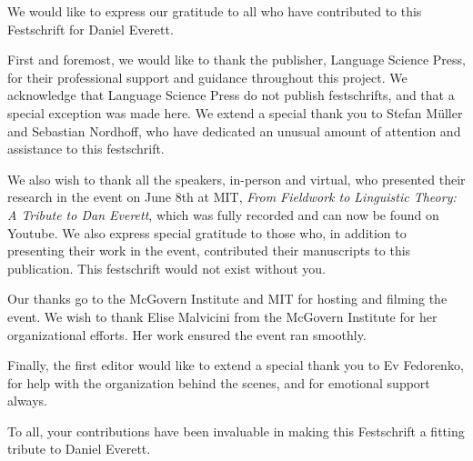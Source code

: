 \addchap{\lsAcknowledgementTitle} 

We would like to express our gratitude to all who have contributed to this Festschrift for Daniel Everett. 

First and foremost, we would like to thank the publisher, Language Science Press, for their professional support and guidance throughout this project. We acknowledge that Language Science Press do not publish festschrifts, and that a special exception was made here. We extend a special thank you to Stefan Müller and Sebastian Nordhoff, who have dedicated an unusual amount of attention and assistance to this festschrift. 

We also wish to thank all the speakers, in-person and virtual, who presented their research in the event on June 8th at MIT, \textit{From Fieldwork to Linguistic Theory: A Tribute to Dan Everett}, which was fully recorded and can now be found on Youtube. We also express special gratitude to those who, in addition to presenting their work in the event, contributed their manuscripts to this publication. This festschrift would not exist without you. 

Our thanks go to the McGovern Institute and MIT for hosting and filming the event. We wish to thank Elise Malvicini from the McGovern Institute for her organizational efforts. Her work ensured the event ran smoothly. 

Finally, the first editor would like to extend a special thank you to Ev Fedorenko, for help with the organization behind the scenes, and for emotional support always.

To all, your contributions have been invaluable in making this Festschrift a fitting tribute to Daniel Everett.
